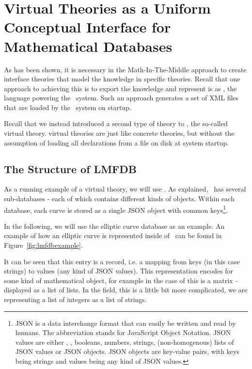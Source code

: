 \section{Virtual Theories as a Uniform Conceptual Interface for Mathematical Databases}\label{sec:vt}

As has been shown, it is necessary in the Math-In-The-Middle approach to create interface theories that model the knowledge in specific theories. 
Recall that one approach to achieving this is to export the knowledge and represent is as \omdocmmt, the language powering the \mmt\ system. 
Such an approach generates a set of XML files that are loaded by the \mmt\ system on startup. 

Recall that we instead introduced a second type of theory to \mmt, the so-called virtual theory.
virtual theories are just like concrete theories, but without the assumption of loading all declarations from a file on disk at system startup. 

\subsection{The Structure of LMFDB}\label{sec:vt:lmfdb}

As a running example of a virtual theory, we will use \lmfdb. 
As explained, \lmfdb\ has several sub-databases - each of which contains different kinds of objects. 
Within each database, each curve is stored as a single JSON object with common keys\footnote{
  JSON \cite{JSON:web} is a data interchange format that can easily be written and read by humans. 
  The abbreviation stands for JavaScript Object Notation. 
  JSON values are either , , booleans, numbers, strings, (non-homogenous) lists of JSON values or JSON objects. 
  JSON objects are key-value pairs, with keys being strings and values being any kind of JSON values. 
}.

%
In the following, we will use the elliptic curve database as an example. 
An example of how an elliptic curve is represented inside of \lmfdb\ can be found in Figure~\ref{fig:lmfdbexample}.

It can be seen that this entry is a record, i.e. a mapping from keys (in this case strings) to values (any kind of JSON values). 
This representation encodes for some kind of mathematical object, for example in the case of  this is a matrix -- displayed as a list of lists.
In the  field, this is a little bit more complicated, we are representing a list of integers as a list of strings.

